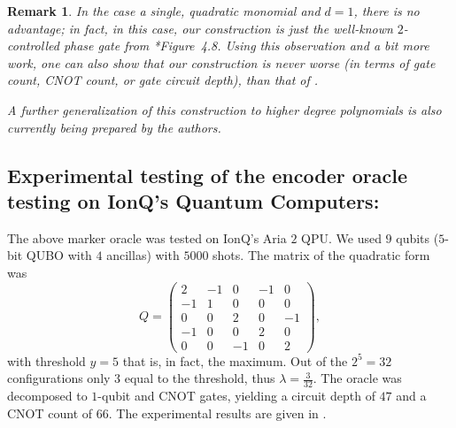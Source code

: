 \documentclass[reqno, 10pt]{amsart}
\numberwithin{equation}{section}                     %
\newtheorem{remark}[theorem]{Remark}
\begin{document}
\smallskip

\begin{remark}
    In the case a single, quadratic monomial and $d = 1$, there is no advantage; in fact, in this case, our construction is just the well-known $2$-controlled phase gate from \cite{nielsen_quantum_2010}*{Figure~4.8}. Using this observation and a bit more work, one can also show that our construction is never worse (in terms of gate count, CNOT count, or gate circuit depth), than that of \cite{gilliam_grover_2021}.

    A further generalization of this construction to higher degree polynomials is also currently being prepared by the authors.
\end{remark}

\medskip

\subsection{Experimental testing of the encoder oracle testing on IonQ's Quantum Computers:} The above marker oracle was tested on IonQ's Aria $2$ QPU. We used $9$ qubits ($5$-bit QUBO with $4$ ancillas) with $5000$ shots. The matrix of the quadratic form was
\begin{equation}
    Q = \begin{pmatrix}
            2 & - 1 & 0 & - 1 & 0 \\
            - 1 & 1 & 0 & 0 & 0 \\
            0 & 0 & 2 & 0 & - 1 \\
            - 1 & 0 & 0 & 2 & 0 \\
            0 & 0 & - 1 & 0 & 2
        \end{pmatrix},
\end{equation}
with threshold $y = 5$ that is, in fact, the maximum. Out of the $2^5 = 32$ configurations only $3$ equal to the threshold, thus $\lambda = \tfrac{3}{32}$. The oracle was decomposed to $1$-qubit and CNOT gates, yielding a circuit depth of $47$ and a CNOT count of $66$. The experimental results are given in .
\end{document}
